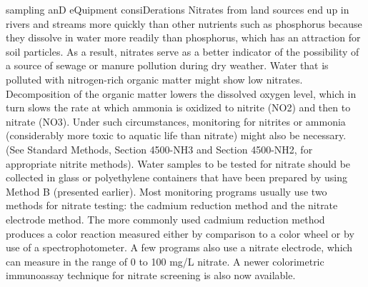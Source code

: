 \documentclass{article}
\begin{document}
sampling anD eQuipment consiDerations Nitrates from land sources end up
in rivers and streams more quickly than other nutrients such as
phosphorus because they dissolve in water more readily than phosphorus,
which has an attraction for soil particles. As a result, nitrates serve
as a better indicator of the possibility of a source of sewage or manure
pollution during dry weather. Water that is polluted with nitrogen-rich
organic matter might show low nitrates. Decomposition of the organic
matter lowers the dissolved oxygen level, which in turn slows the rate
at which ammonia is oxidized to nitrite (NO2) and then to nitrate (NO3).
Under such circumstances, monitoring for nitrites or ammonia
(considerably more toxic to aquatic life than nitrate) might also be
necessary. (See Standard Methods, Section 4500-NH3 and Section 4500-NH2,
for appropriate nitrite methods). Water samples to be tested for nitrate
should be collected in glass or polyethylene containers that have been
prepared by using Method B (presented earlier). Most monitoring programs
usually use two methods for nitrate testing: the cadmium reduction
method and the nitrate electrode method. The more commonly used cadmium
reduction method produces a color reaction measured either by comparison
to a color wheel or by use of a spectrophotometer. A few programs also
use a nitrate electrode, which can measure in the range of 0 to 100 mg/L
nitrate. A newer colorimetric immunoassay technique for nitrate
screening is also now available.
\end{document}
